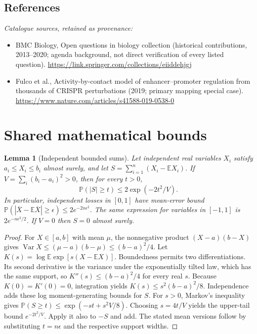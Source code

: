 \documentclass[11pt]{article}
\newcommand{\E}{\mathbb E}
\newcommand{\Prob}{\mathbb P}
\DeclareMathOperator{\Var}{Var}
\providecommand{\E}{\mathbb E}
\providecommand{\Prob}{\mathbb P}
\providecommand{\Var}{\operatorname{Var}}
\newtheorem{sharedlemma}{Lemma}[section]
\begin{document}
\subsection{References}
\noindent\emph{Catalogue sources, retained as provenance:}
\begin{itemize}
\item BMC Biology, Open questions in biology collection (historical contributions, 2013--2020; agenda background, not direct verification of every listed question). \url{https://link.springer.com/collections/eiiddehjgj}
\item Fulco et al., Activity-by-contact model of enhancer--promoter regulation from thousands of CRISPR perturbations (2019; primary mapping special case). \url{https://www.nature.com/articles/s41588-019-0538-0}
\end{itemize}
\clearpage


\appendix
\section{Shared mathematical bounds}\label{app:bounds}
\begin{sharedlemma}[Independent bounded sums]\label{lem:bounded}
Let independent real variables $X_i$ satisfy $a_i\leq X_i\leq b_i$ almost surely,
and let $S=\sum_{i=1}^n(X_i-\E X_i)$. If
$V=\sum_i(b_i-a_i)^2>0$, then for every $t>0$,
\[
 \Prob(|S|\geq t)\leq 2\exp(-2t^2/V).
\]
In particular, independent losses in $[0,1]$ have mean-error bound
$\Prob(|\overline X-\E\overline X|\geq\epsilon)
\leq2e^{-2n\epsilon^2}$. The same expression for variables in $[-1,1]$
is $2e^{-n\epsilon^2/2}$. If $V=0$ then $S=0$ almost surely.
\end{sharedlemma}
\begin{proof}
For $X\in[a,b]$ with mean $\mu$, the nonnegative product
$(X-a)(b-X)$ gives
$\Var X\leq(\mu-a)(b-\mu)\leq(b-a)^2/4$.
Let $K(s)=\log\E\exp[s(X-\E X)]$.
Boundedness permits two differentiations. Its second derivative is the variance
under the exponentially tilted law, which has the same support, so
$K''(s)\leq(b-a)^2/4$ for every real $s$.
Because $K(0)=K'(0)=0$, integration yields
$K(s)\leq s^2(b-a)^2/8$.
Independence adds these log moment-generating bounds for $S$.
For $s>0$, Markov's inequality gives
$\Prob(S\geq t)\leq\exp(-st+s^2V/8)$.
Choosing $s=4t/V$ yields the upper-tail bound $e^{-2t^2/V}$.
Apply it also to $-S$ and add. The stated mean versions follow by substituting
$t=n\epsilon$ and the respective support widths.
\end{proof}
\end{document}
